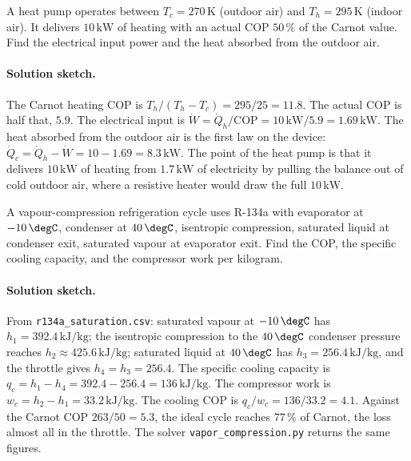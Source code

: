 \begin{exercise}
A heat pump operates between $T_c = 270\,\si{\kelvin}$ (outdoor air)
and $T_h = 295\,\si{\kelvin}$ (indoor air). It delivers $10\,\text{kW}$
of heating with an actual COP $50\,\%$ of the Carnot value. Find the
electrical input power and the heat absorbed from the outdoor air.

\paragraph{Solution sketch.} The Carnot heating COP is $T_h/(T_h - T_c)
= 295/25 = 11.8$. The actual COP is half that, $5.9$. The electrical
input is $\dot W = \dot Q_h/\text{COP} = 10\,\text{kW}/5.9 =
1.69\,\text{kW}$. The heat absorbed from the outdoor air is the first
law on the device: $\dot Q_c = \dot Q_h - \dot W = 10 - 1.69 =
8.3\,\text{kW}$. The point of the heat pump is that it delivers
$10\,\text{kW}$ of heating from $1.7\,\text{kW}$ of electricity by
pulling the balance out of cold outdoor air, where a resistive heater
would draw the full $10\,\text{kW}$.
\end{exercise}

\begin{exercise}
A vapour-compression refrigeration cycle uses R-134a with evaporator
at $-10\,\degC$, condenser at $40\,\degC$, isentropic compression,
saturated liquid at condenser exit, saturated vapour at evaporator
exit. Find the COP, the specific cooling capacity, and the
compressor work per kilogram.

\paragraph{Solution sketch.} From \texttt{r134a\_saturation.csv}:
saturated vapour at $-10\,\degC$ has $h_1 = 392.4\,\text{kJ}/\text{kg}$;
the isentropic compression to the $40\,\degC$ condenser pressure reaches
$h_2 \approx 425.6\,\text{kJ}/\text{kg}$; saturated liquid at $40\,\degC$
has $h_3 = 256.4\,\text{kJ}/\text{kg}$, and the throttle gives $h_4 =
h_3 = 256.4$. The specific cooling capacity is $q_c = h_1 - h_4 =
392.4 - 256.4 = 136\,\text{kJ}/\text{kg}$. The compressor work is $w_c =
h_2 - h_1 = 33.2\,\text{kJ}/\text{kg}$. The cooling COP is $q_c/w_c =
136/33.2 = 4.1$. Against the Carnot COP $263/50 = 5.3$, the ideal cycle
reaches $77\,\%$ of Carnot, the loss almost all in the throttle. The
solver \texttt{vapor\_compression.py} returns the same figures.
\end{exercise}

